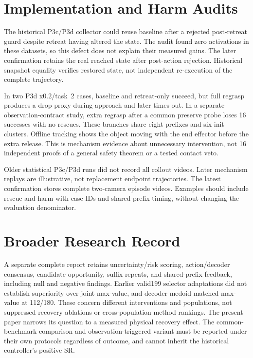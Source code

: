 \documentclass{article}
\begin{document}
\section{Implementation and Harm Audits}
\label{app:audit}
The historical P3c/P3d collector could reuse baseline after a rejected
post-retreat guard despite retreat having altered the state.
The audit found zero activations in these datasets, so this defect does
not explain their measured gains.
The later confirmation retains the real reached state after post-action
rejection. Historical snapshot equality verifies restored state, not
independent re-execution of the complete trajectory.

In two P3d x0.2/task~2 cases, baseline and retreat-only succeed, but full
regrasp produces a drop proxy during approach and later times out.
In a separate observation-contract study, extra regrasp after a common
preserve probe loses 16 successes with no rescues. These branches share eight
prefixes and six init clusters.
Offline tracking shows the object moving with the end effector before
the extra release. This is mechanism evidence about unnecessary intervention,
not 16 independent proofs of a general safety theorem or a tested contact veto.

Older statistical P3c/P3d runs did not record all rollout videos.
Later mechanism replays are illustrative, not replacement endpoint trajectories.
The latest confirmation stores complete two-camera episode videos.
Examples should include rescue and harm with case IDs and shared-prefix
timing, without changing the evaluation denominator.

\section{Broader Research Record}
A separate complete report retains uncertainty/risk scoring, action/decoder
consensus, candidate opportunity, suffix repeats, and shared-prefix feedback,
including null and negative findings.
Earlier valid199 selector adaptations did not establish superiority over
joint max-value, and decoder medoid matched max-value at 112/180.
These concern different interventions and populations, not suppressed
recovery ablations or cross-population method rankings.
The present paper narrows its question to a measured physical recovery effect.
The common-benchmark comparison and observation-triggered variant must be
reported under their own protocols regardless of outcome, and cannot inherit
the historical controller's positive SR.
\end{document}
